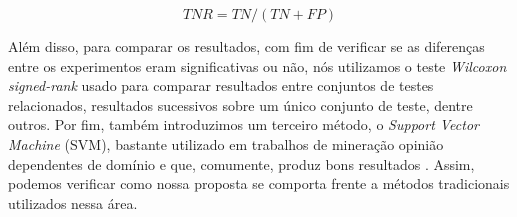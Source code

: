 \begin{equation}
TNR = TN / (TN + FP)
\label{eq:tnr}
\end{equation}

Além disso, para comparar os resultados, com fim de verificar se as diferenças entre os experimentos eram significativas ou não, nós utilizamos o teste \textit{Wilcoxon signed-rank} \cite{wilcoxon1945individual} usado para comparar resultados entre conjuntos de testes relacionados, resultados sucessivos sobre um único conjunto de teste, dentre outros. Por fim, também introduzimos um terceiro método, o \textit{Support Vector Machine} (SVM), bastante utilizado em trabalhos de mineração opinião dependentes de domínio e que, comumente, produz bons resultados \cite{ohana2009sentiment, moraes2012document}. Assim, podemos verificar como nossa proposta se comporta frente a métodos tradicionais utilizados nessa área. 